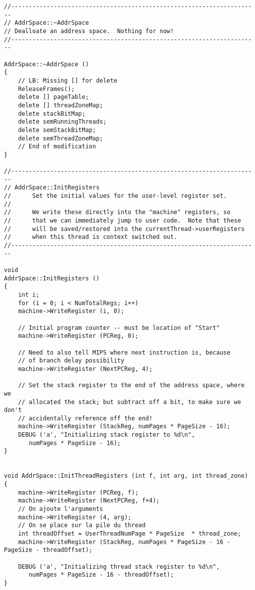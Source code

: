\documentclass[a4paper,10pt]{article}
\begin{document}
\begin{lstlisting}
//----------------------------------------------------------------------
// AddrSpace::~AddrSpace
// Dealloate an address space.  Nothing for now!
//----------------------------------------------------------------------

AddrSpace::~AddrSpace ()
{
    // LB: Missing [] for delete
    ReleaseFrames();
    delete [] pageTable;
    delete [] threadZoneMap;
    delete stackBitMap;
    delete semRunningThreads;
    delete semStackBitMap;
    delete semThreadZoneMap;
    // End of modification
}

//----------------------------------------------------------------------
// AddrSpace::InitRegisters
//      Set the initial values for the user-level register set.
//
//      We write these directly into the "machine" registers, so
//      that we can immediately jump to user code.  Note that these
//      will be saved/restored into the currentThread->userRegisters
//      when this thread is context switched out.
//----------------------------------------------------------------------

void
AddrSpace::InitRegisters ()
{
    int i;
    for (i = 0; i < NumTotalRegs; i++)
    machine->WriteRegister (i, 0);

    // Initial program counter -- must be location of "Start"
    machine->WriteRegister (PCReg, 0);

    // Need to also tell MIPS where next instruction is, because
    // of branch delay possibility
    machine->WriteRegister (NextPCReg, 4);

    // Set the stack register to the end of the address space, where we
    // allocated the stack; but subtract off a bit, to make sure we don't
    // accidentally reference off the end!
    machine->WriteRegister (StackReg, numPages * PageSize - 16);
    DEBUG ('a', "Initializing stack register to %d\n",
       numPages * PageSize - 16);
}


void AddrSpace::InitThreadRegisters (int f, int arg, int thread_zone)
{
    machine->WriteRegister (PCReg, f);
    machine->WriteRegister (NextPCReg, f+4);
    // On ajoute l'arguments
    machine->WriteRegister (4, arg);
    // On se place sur la pile du thread
    int threadOffset = UserThreadNumPage * PageSize  * thread_zone;
    machine->WriteRegister (StackReg, numPages * PageSize - 16 - PageSize - threadOffset);

    DEBUG ('a', "Initializing thread stack register to %d\n",
       numPages * PageSize - 16 - threadOffset);
}


\end{lstlisting}
\end{document}
